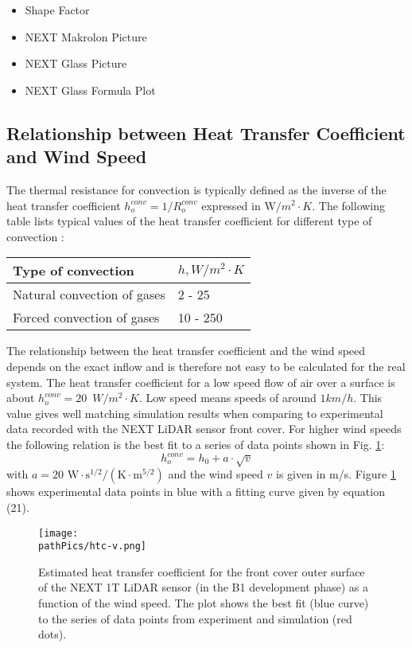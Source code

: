 \begin{itemize}
\item Shape Factor
\item NEXT Makrolon Picture
\item NEXT Glass Picture
\item NEXT Glass Formula Plot
\end{itemize}

\subsection{Relationship between Heat Transfer Coefficient and Wind Speed}\label{chapter:windspeedrelation}
The thermal resistance for convection is typically defined as the inverse of the heat transfer coefficient \(h_o^{conv} = 1/R_o^{conv}\) expressed in \(\mathrm{W}/m^2\cdot K\). The following table lists typical values of the heat transfer coefficient for different type of convection \cite{Unnamed-2}: 

\begin{table} [H]
\centering
\color{B}
\begin{tabular} [h] {  p{50mm} p{27mm} }
Type of convection & $h, \unit{W/{m^2\cdot K}}$ \\ \hline
Natural convection of gases & 2 - 25 \\ 
Forced convection of gases & 10 - 250 
\end{tabular}
\end{table}
The relationship between the heat transfer coefficient and the wind speed depends on the exact inflow and is therefore not easy to be calculated for the real system. The heat transfer coefficient for a low speed flow of air over a surface is about \(h_o^{conv} = 20 \,\,\,\unit{W/m^2\cdot K}\). Low speed means speeds of around $1 \unit{km/h}$. This value gives well matching simulation results when comparing to experimental data recorded with the NEXT LiDAR sensor front cover. For higher wind speeds the following relation is the best fit to a series of data points shown in Fig. \ref{fig:HTC}: 
\begin{equation}
h_o^{conv} = h_0 + a\cdot \sqrt{v}
\end{equation}
with \(a = 20 \, \,\mathrm{W\cdot s^{1/2}/(K\cdot m^{5/2})}\) and the wind speed $v$ is given in m/s. 
Figure \ref{fig:HTC} shows experimental data points in blue with a fitting curve given by equation (21). 
\begin{figure} [H]
	\centering
	\texttt{[image: \\pathPics/htc-v.png]}
	\caption[Heat Transfer Coefficient vs Wind Speed]{Estimated heat transfer coefficient for the front cover outer surface of the NEXT 1T LiDAR sensor (in the B1 development phase) as a function of the wind speed. The plot shows the best fit (blue curve) to the series of data points from experiment and simulation (red dots).}
	\label{fig:HTC}
\end{figure}


